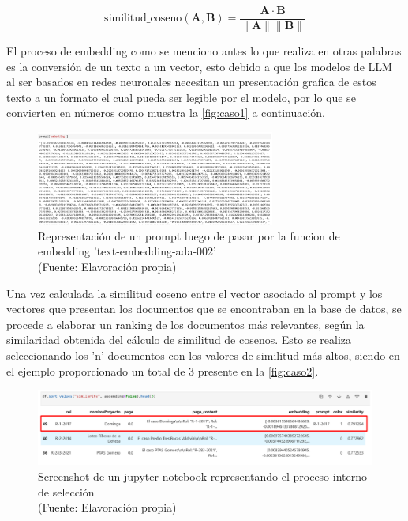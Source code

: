\begin{equation}
    \text{similitud\_coseno}(\mathbf{A}, \mathbf{B}) = \frac{\mathbf{A} \cdot \mathbf{B}}{\|\mathbf{A}\| \|\mathbf{B}\|}
    \label{eq:similitudcoseno}
\end{equation}


El proceso de embedding como se menciono antes lo que realiza en otras palabras es la conversión de un texto a un vector, esto debido a que los modelos de LLM al ser basados 
en redes neuronales necesitan un presentación grafica de estos texto a un formato el cual pueda ser legible por el modelo, por lo que se convierten en números como muestra la 
\autoref{fig:caso1} a continuación.

\begin{figure}[ht!]
    \centering
    \includegraphics[width=0.7\textwidth]{figures/embedding1.png}
    \caption[Representación vectorial de un prompt luego de pasar por la funcion de embedding]{Representación de un prompt luego de pasar por la funcion de embedding 'text-embedding-ada-002'\\
    {\scriptsize (Fuente: Elavoración propia)}}
    \label{fig:caso1}
\end{figure}


Una vez calculada la similitud coseno entre el vector asociado al prompt y los vectores que presentan los documentos que se encontraban en la 
base de datos, se procede a elaborar un ranking de los documentos más relevantes, según la similaridad obtenida del cálculo de similitud de cosenos. 
Esto se realiza seleccionando los 'n' documentos con los valores de similitud más altos, siendo en el ejemplo proporcionado un total de 3 
presente en la \autoref{fig:caso2}.

\begin{figure}[ht!]
    \centering
    \includegraphics[width=1\textwidth]{figures/embedding2.png}
    \caption[Screenshot de un jupyter notebook representando el proceso interno de selección]{Screenshot de un jupyter notebook representando el proceso interno de selección\\
    {\scriptsize (Fuente: Elavoración propia)}}
    \label{fig:caso2}
\end{figure}

